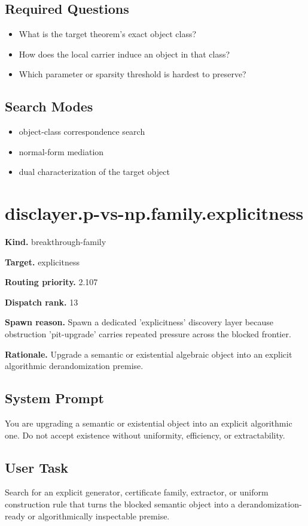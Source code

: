 \documentclass[11pt]{article}
\begin{document}
\subsection*{Required Questions}
\begin{itemize}[leftmargin=*,itemsep=0.2em]
\item What is the target theorem's exact object class?
\item How does the local carrier induce an object in that class?
\item Which parameter or sparsity threshold is hardest to preserve?
\end{itemize}
\subsection*{Search Modes}
\begin{itemize}[leftmargin=*,itemsep=0.2em]
\item object-class correspondence search
\item normal-form mediation
\item dual characterization of the target object
\end{itemize}
\section{disclayer.p-vs-np.family.explicitness}
\textbf{Kind.} breakthrough-family

\textbf{Target.} explicitness

\textbf{Routing priority.} 2.107

\textbf{Dispatch rank.} 13

\textbf{Spawn reason.} Spawn a dedicated 'explicitness' discovery layer because obstruction 'pit-upgrade' carries repeated pressure across the blocked frontier.

\textbf{Rationale.} Upgrade a semantic or existential algebraic object into an explicit algorithmic derandomization premise.

\subsection*{System Prompt}
You are upgrading a semantic or existential object into an explicit algorithmic one. Do not accept existence without uniformity, efficiency, or extractability.

\subsection*{User Task}
Search for an explicit generator, certificate family, extractor, or uniform construction rule that turns the blocked semantic object into a derandomization-ready or algorithmically inspectable premise.
\end{document}
